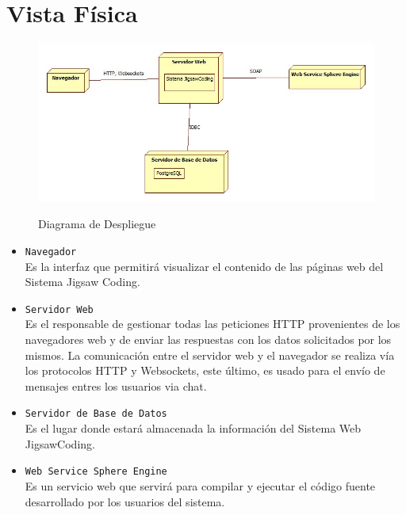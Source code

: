 \section{Vista Física}
\begin{figure}[!h]
  \centering
  \includegraphics[scale=0.5]{figuras/sad/diagrama_de_despliegue.jpg}\\
  \caption{Diagrama de Despliegue}\label{fig:diagrama_de_despliegue}
\end{figure}
\begin{itemize}
  \item \texttt{Navegador}\\Es la interfaz que permitirá visualizar el contenido de las páginas web del Sistema Jigsaw Coding. 
  \item \texttt{Servidor Web}\\Es el responsable de gestionar todas las peticiones HTTP provenientes de los navegadores web y de enviar las respuestas con los datos solicitados por los mismos. La comunicación entre el servidor web y el navegador se realiza vía los protocolos HTTP y Websockets, este último, es usado para el envío de mensajes entres los usuarios via chat.
  \item \texttt{Servidor de Base de Datos}\\Es el lugar donde estará almacenada la información del Sistema Web JigsawCoding.
  \item \texttt{Web Service Sphere Engine}\\Es un servicio web que servirá para compilar y ejecutar el código fuente desarrollado por los usuarios del sistema.
\end{itemize}
